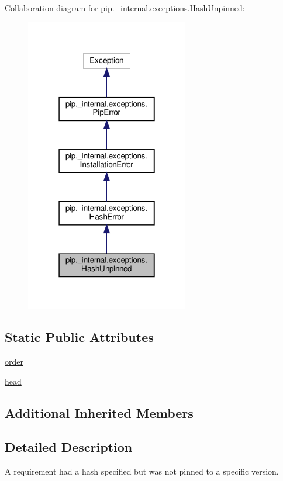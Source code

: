 Collaboration diagram for pip.\+\_\+internal.\+exceptions.\+Hash\+Unpinned\+:
\nopagebreak
\begin{figure}[H]
\begin{center}
\leavevmode
\includegraphics[width=202pt]{classpip_1_1__internal_1_1exceptions_1_1HashUnpinned__coll__graph}
\end{center}
\end{figure}
\subsection*{Static Public Attributes}
\begin{DoxyCompactItemize}
\item 
\hyperlink{classpip_1_1__internal_1_1exceptions_1_1HashUnpinned_a8fa6b53db2e732edc7be1d2fcb2b0502}{order}
\item 
\hyperlink{classpip_1_1__internal_1_1exceptions_1_1HashUnpinned_a4ee068ded09252d2b209c47de29a094d}{head}
\end{DoxyCompactItemize}
\subsection*{Additional Inherited Members}


\subsection{Detailed Description}
\begin{DoxyVerb}A requirement had a hash specified but was not pinned to a specific
version.\end{DoxyVerb}
 

